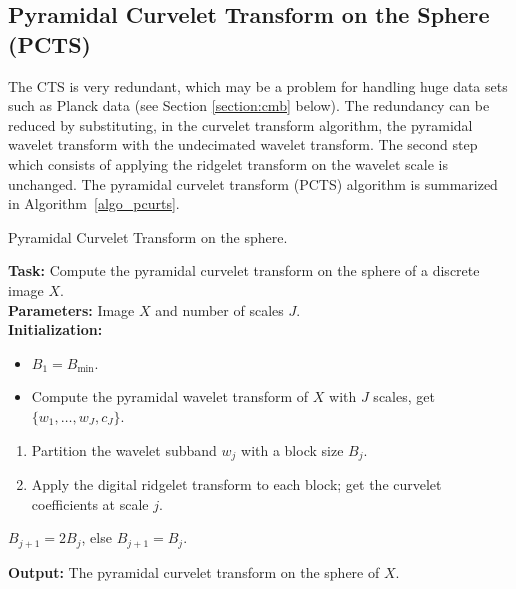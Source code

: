 \subsection{Pyramidal Curvelet Transform on the Sphere (PCTS)}
The CTS is very redundant, which may be a problem for handling huge data sets such as 
Planck data (see Section \ref{section:cmb} below). 
The redundancy can be reduced by substituting, in the 
curvelet transform algorithm, the pyramidal wavelet transform with the undecimated wavelet transform.
The second step which consists of applying the ridgelet transform on the wavelet scale is unchanged.
The pyramidal curvelet transform (PCTS) algorithm is summarized in Algorithm~\ref{algo_pcurts}.

{\linespread{1}
\begin{algorithm}[h]
\caption{Pyramidal Curvelet Transform on the sphere.}
\label{algo_pcurts}
{\bf Task:} Compute the pyramidal curvelet transform on the sphere of a discrete image $X$.\\
{\bf Parameters:} Image $X$ and number of scales $J$.\\
{\bf Initialization:} 
\begin{itemize}
\item $B_1 = B_{\min}$.
\item Compute the pyramidal wavelet transform of $X$ with $J$ scales, get $\{w_1,\dots,w_J,c_J\}$.
\end{itemize}
 {
\begin{enumerate}[1.]
\item Partition the wavelet subband $w_j$ with a block size $B_j$.
\item Apply the digital ridgelet transform to each block; get the curvelet coefficients at scale $j$.
\end{enumerate}
 $B_{j+1} = 2 B_{j}$,  else $B_{j+1} = B_{j}$.
}
{\bf Output:} The pyramidal curvelet transform on the sphere of $X$.
\end{algorithm}
}

 